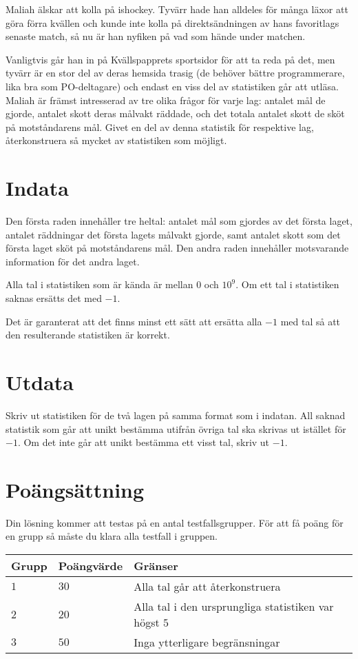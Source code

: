 Maliah älskar att kolla på ishockey.
Tyvärr hade han alldeles för många läxor att göra förra kvällen och kunde inte kolla på direktsändningen av hans favoritlags senaste match, så nu är han nyfiken på vad som hände under matchen.

Vanligtvis går han in på Kvällspapprets sportsidor för att ta reda på det, men tyvärr är en stor del av deras hemsida trasig (de behöver bättre programmerare, lika bra som PO-deltagare) och endast en viss del av statistiken går att utläsa.
Maliah är främst intresserad av tre olika frågor för varje lag: antalet mål de gjorde, antalet skott deras målvakt räddade, och det totala antalet skott de sköt på motståndarens mål.
Givet en del av denna statistik för respektive lag, återkonstruera så mycket av statistiken som möjligt.

\section*{Indata}
Den första raden innehåller tre heltal: antalet mål som gjordes av det första laget, antalet räddningar det första lagets målvakt gjorde, samt antalet skott som det första laget sköt på motståndarens mål.
Den andra raden innehåller motsvarande information för det andra laget.

Alla tal i statistiken som är kända är mellan $0$ och $10^9$.
Om ett tal i statistiken saknas ersätts det med $-1$.

Det är garanterat att det finns minst ett sätt att ersätta alla $-1$ med tal så att den resulterande statistiken är korrekt.

\section*{Utdata}
Skriv ut statistiken för de två lagen på samma format som i indatan.
All saknad statistik som går att unikt bestämma utifrån övriga tal ska skrivas ut istället för $-1$.
Om det inte går att unikt bestämma ett visst tal, skriv ut $-1$.

\section*{Poängsättning}
Din lösning kommer att testas på en antal testfallsgrupper.
För att få poäng för en grupp så måste du klara alla testfall i gruppen.

\noindent
\begin{tabular}{| l | l | p{12cm} |}
  \hline
  Grupp & Poängvärde & Gränser \\ \hline
  $1$   & $30$       & Alla tal går att återkonstruera \\ \hline
  $2$   & $20$       & Alla tal i den ursprungliga statistiken var högst $5$ \\ \hline
  $3$   & $50$       & Inga ytterligare begränsningar \\ \hline
\end{tabular}

